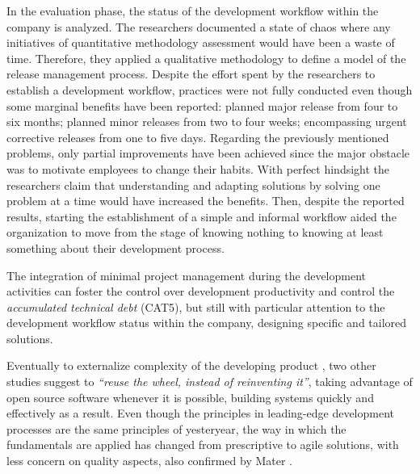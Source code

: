 \documentclass[10pt,journal,letterpaper,compsoc]{IEEEtran}
\begin{document}
In the evaluation phase, the status of the development workflow
within the  company  is analyzed. The researchers documented a state of chaos
where any  initiatives of quantitative methodology assessment would have been a
waste of  time. Therefore, they applied a qualitative methodology to define a
model of the  release management process.  
Despite the effort spent by the researchers to establish a development workflow, 
practices were not fully conducted even though some marginal benefits have been 
reported: planned major release from four to six months; planned minor releases 
from two to four weeks; encompassing urgent corrective releases from one to five 
days.  
Regarding the previously mentioned problems, only  partial improvements have 
been achieved since the major obstacle was to  motivate employees to change 
their habits. With perfect hindsight the researchers claim that understanding 
and adapting solutions by solving one problem at a time would have increased 
the benefits. Then, despite the reported results, starting the establishment of 
a simple and informal workflow aided the organization to move from the stage of 
knowing nothing to knowing at least something about their development process.

The integration of minimal project management during the development activities
can foster the control over development productivity and control the
\textit{accumulated technical debt} (CAT5), but still with particular attention
to the development workflow status within the company, designing specific and
tailored solutions.

Eventually to externalize complexity of the developing product 
, two other studies \cite{Wall2001, Bean2005} suggest to \textit{``reuse the  
wheel, instead of reinventing it''}, taking advantage of open source software  
whenever it is possible, building systems quickly and effectively as a result.  
Even though the principles in leading-edge development processes are the same
principles of yesteryear, the way in which the fundamentals are applied has
changed from prescriptive to agile solutions, with less concern on quality
aspects, also confirmed by Mater \cite{Mater2000}.
\end{document}
